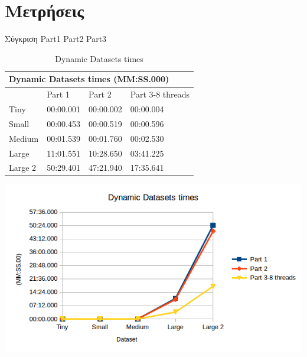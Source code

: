 \documentclass[12pt]{article}
\begin{document}
\section{Μετρήσεις}
Σύγκριση Part1 Part2 Part3\\
\begin{table}[H]
\caption{Dynamic Datasets times}

\begin{minipage}{.5\textwidth}
\footnotesize
\label{ddt}
\tabcolsep=0.11cm
\begin{tabular}{|l|l|l|l|}
\hline
\multicolumn{4}{|l|}{Dynamic Datasets times (MM:SS.000)} \\ \hline
          & Part 1      & Part 2     & Part 3-8 threads  \\ \hline
Tiny      & 00:00.001   & 00:00.002  & 00:00.004         \\ \hline
Small     & 00:00.453   & 00:00.519  & 00:00.596         \\ \hline
Medium    & 00:01.539   & 00:01.760  & 00:02.530         \\ \hline
Large     & 11:01.551   & 10:28.650  & 03:41.225         \\ \hline
Large 2   & 50:29.401   & 47:21.940  & 17:35.641         \\ \hline
\end{tabular}
\end{minipage}%
\begin{minipage}{.5\textwidth}
\includegraphics[scale=0.5]{DynamicDatasets_times.png}
\end{minipage}%
\end{table}
\end{document}
